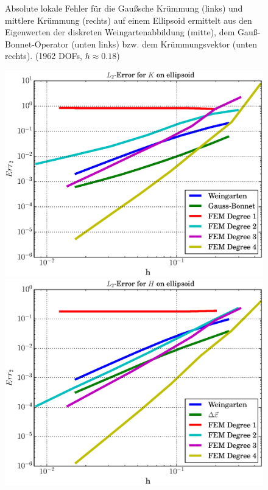 \begin{figure}
\begin{minipage}[t]{0.49\textwidth}
    \end{minipage}
    \caption[Fehler (Krümmungen auf Ellipsoid)]
            {Absolute lokale Fehler für die Gaußsche Krümmung (links) und mittlere Krümmung (rechts) auf
            einem Ellipsoid
             ermittelt aus den Eigenwerten der diskreten Weingartenabbildung (mitte), dem
             Gauß-Bonnet-Operator (unten links) bzw. dem Krümmungsvektor (unten rechts).
             (1962 DOFs, \( h\approx0.18 \))}
    \label{figErrCurvHeineC}
  \end{figure}

  \begin{figure}
    \begin{minipage}[t]{0.49\textwidth}
       \centering\includegraphics[width=\textwidth]{bilder/Curvature/heineC/ErrKL2.eps}
    \end{minipage}\hfill
    \begin{minipage}[t]{0.49\textwidth}
       \centering\includegraphics[width=\textwidth]{bilder/Curvature/heineC/ErrHL2.eps}

\end{minipage}
\end{figure}
